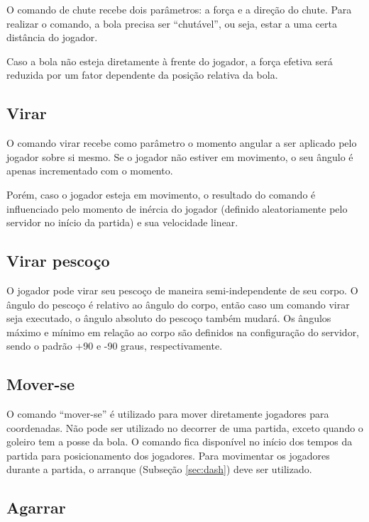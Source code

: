 O comando de chute recebe dois parâmetros: a força e a direção do chute. Para realizar o comando, a bola precisa ser ``chutável'', ou seja, estar a uma certa distância do jogador.

Caso a bola não esteja diretamente à frente do jogador, a força efetiva será reduzida por um fator dependente da posição relativa da bola.

\subsection{Virar}

O comando virar recebe como parâmetro o momento angular a ser aplicado pelo jogador sobre si mesmo. Se o jogador não estiver em movimento, o seu ângulo é apenas incrementado com o momento.

Porém, caso o jogador esteja em movimento, o resultado do comando é influenciado pelo momento de inércia do jogador (definido aleatoriamente pelo servidor no início da partida) e sua velocidade linear.

\subsection{Virar pescoço}

O jogador pode virar seu pescoço de maneira semi-independente de seu corpo. O ângulo do pescoço é relativo ao ângulo do corpo, então caso um comando virar seja executado, o ângulo absoluto do pescoço também mudará. Os ângulos máximo e mínimo em relação ao corpo são definidos na configuração do servidor, sendo o padrão +90 e -90 graus, respectivamente.

\subsection{Mover-se}
\label{sec:move}

O comando ``mover-se'' é utilizado para mover diretamente jogadores para coordenadas. Não pode ser utilizado no decorrer de uma partida, exceto quando o goleiro tem a posse da bola. O comando fica disponível no início dos tempos da partida para posicionamento dos jogadores. Para movimentar os jogadores durante a partida, o arranque (Subseção \ref{sec:dash}) deve ser utilizado.

\subsection{Agarrar}

